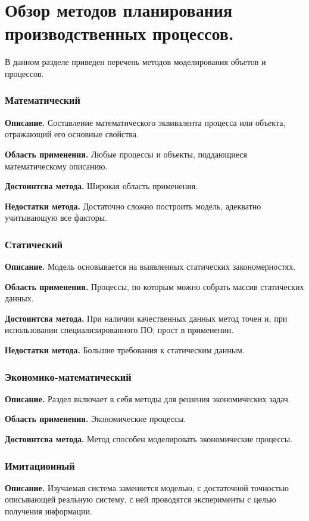 \section{Обзор методов планирования производственных процессов.}

В данном разделе приведен перечень методов моделирования объетов и процессов.

\subsubsection*{Математический}
\textbf{Описание.} Составление математического эквивалента процесса или объекта, отражающий его основные свойства.

\textbf{Область применения.} Любые процессы и объекты, поддающиеся математическому описанию.

\textbf{Достоинтсва метода.} Широкая область применения.

\textbf{Недостатки метода.} Достаточно сложно построить модель, адекватно учитывающую все факторы.

\subsubsection*{Статический}
\textbf{Описание.} Модель основывается на выявленных статических закономерностях.

\textbf{Область применения.} Процессы, по которым можно собрать массив статических данных.

\textbf{Достоинтсва метода.} При наличии качественных данных метод точен и, при использовании специализированного ПО, прост в применении.

\textbf{Недостатки метода.} Большие требования к статическим данным.
\subsubsection*{Экономико-математический}
\textbf{Описание.} Раздел включает в себя методы для решения экономических задач.

\textbf{Область применения.} Экономические процессы.

\textbf{Достоинтсва метода.} Метод способен моделировать экономические процессы.

\subsubsection*{Имитационный}
\textbf{Описание.} Изучаемая система заменяется моделью, с достаточной точностью описывающей реальную систему, с ней проводятся эксперименты с целью получения информации.

